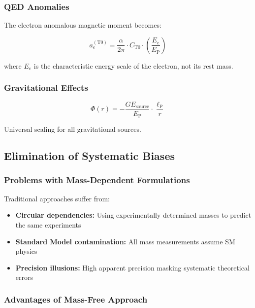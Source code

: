 \documentclass[12pt,a4paper]{article}
\newcommand{\lP}{\ell_{\text{P}}}
\newcommand{\EP}{E_{\text{P}}}
\begin{document}
	\subsubsection{QED Anomalies}
	
	The electron anomalous magnetic moment becomes:
	
	\begin{equation}
		a_e^{(\text{T0})} = \frac{\alpha}{2\pi} \cdot C_{\text{T0}} \cdot \left(\frac{E_e}{\EP}\right)
		\label{eq:qed_universal}
	\end{equation}
	
	where $E_e$ is the characteristic energy scale of the electron, not its rest mass.
	
	\subsubsection{Gravitational Effects}
	
	\begin{equation}
		\Phi(r) = -\frac{G E_{\text{source}}}{\EP} \cdot \frac{\lP}{r}
		\label{eq:gravity_universal}
	\end{equation}
	
	Universal scaling for all gravitational sources.
	
	\subsection{Elimination of Systematic Biases}
	\label{subsec:bias_elimination}
	
	\subsubsection{Problems with Mass-Dependent Formulations}
	
	Traditional approaches suffer from:
	\begin{itemize}
		\item \textbf{Circular dependencies:} Using experimentally determined masses to predict the same experiments
		\item \textbf{Standard Model contamination:} All mass measurements assume SM physics
		\item \textbf{Precision illusions:} High apparent precision masking systematic theoretical errors
	\end{itemize}
	
	\subsubsection{Advantages of Mass-Free Approach}
	
\end{document}

